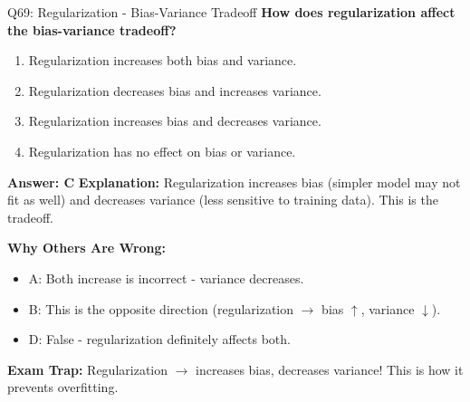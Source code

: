 \documentclass[8pt]{beamer}
\begin{document}
	\begin{frame}{Q69: Regularization - Bias-Variance Tradeoff}
		\fontsize{6.5}{7.5}\selectfont
		\textbf{How does regularization affect the bias-variance tradeoff?}
		
		\begin{enumerate}
			\item Regularization increases both bias and variance.
			\item Regularization decreases bias and increases variance.
			\item Regularization increases bias and decreases variance.
			\item Regularization has no effect on bias or variance.
		\end{enumerate}
		
		\vspace{0.05cm}
		\textcolor{myblue}{\textbf{Answer: C}}
		\vspace{0.05cm}
		\textcolor{myblue}{\textbf{Explanation:}} Regularization increases bias (simpler model may not fit as well) and decreases variance (less sensitive to training data). This is the tradeoff.
		
		\vspace{0.05cm}
		\textcolor{myred}{\textbf{Why Others Are Wrong:}}
		\begin{itemize}
			\item \textcolor{myred}{A:} Both increase is incorrect - variance decreases.
			\item \textcolor{myred}{B:} This is the opposite direction (regularization $\to$ bias $\uparrow$, variance $\downarrow$).
			\item \textcolor{myred}{D:} False - regularization definitely affects both.
		\end{itemize}
		
		\textcolor{myred}{\textbf{Exam Trap:}} Regularization $\rightarrow$ \textcolor{myblue}{increases bias, decreases variance}! This is how it prevents overfitting.
	\end{frame}
	
\end{document}
